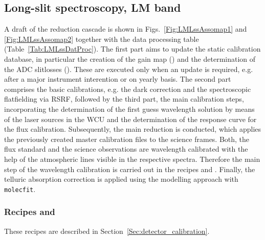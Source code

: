 \clearpage
\subsection{Long-slit spectroscopy, LM band}
\label{ssec:recipes_lss_lm}

A draft of the reduction cascade is shown in
Figs.~\ref{Fig:LMLssAssomap1} and \ref{Fig:LMLssAssomap2} together with the data processing table
(Table~\ref{Tab:LMLssDatProc}). The first part aims to update the static calibration database, in particular the creation of the gain map (\hyperref[Sec:detector_calibration]{}) and the determination of the \ac{ADC} slitlosses (\hyperref[rec:metislmadcmslitloss]{}). These are executed only when an update is required, e.g. after a major instrument interention or on yearly basis. The second part comprises the basic calibrations, e.g. the dark correction and the spectroscopic flatfielding via \ac{RSRF}, followed by the third part, the main calibration steps, incorporating the determination of the first guess wavelength solution by means of the laser sources in the \ac{WCU} and the determination of the response curve for the flux calibration. Subsequently, the main reduction is conducted, which applies the previously created master calibration files to the science frames. Both, the flux standard and the science observations are wavelength calibrated with the help of the atmospheric lines visible in the respective spectra. Therefore the main step of the wavelength calibration is carried out in the recipes \hyperref[rec:lsslmstd]{} and \hyperref[rec:lsslmsci]{}. Finally, the telluric absorption correction is applied using the modelling approach with \texttt{molecfit}.


\subsubsection{Recipes  and }
These recipes are described in Section~\ref{Sec:detector_calibration}.

